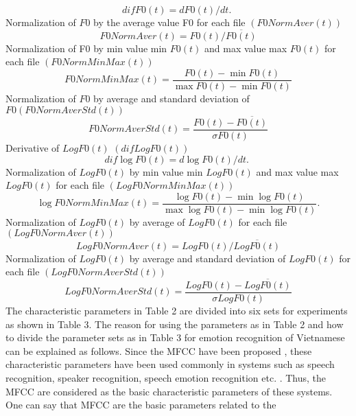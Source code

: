 \documentclass[a4paper,12pt]{article}
\begin{document}
\begin{equation}
difF0(t)=d F 0(t) / d t \text {. }
\end{equation}
Normalization of $F0$ by the average value F0 for each file $(F0NormAver(t))$
\begin{equation}
F 0  NormAver (t)=F 0(t) / \overline{F 0(t)}
\end{equation}
Normalization of F0 by min value min $F0(t)$ and max value max $F0(t)$ for each file
$(F0NormMinMax (t))$
\begin{equation}
 F0NormMinMax (t)=\frac{F 0(t)-\min F 0(t)}{\max F 0(t)-\min F 0(t)}
\end{equation}
Normalization of $F0$ by average and standard deviation of $F0 (F0NormAverStd (t))$
\begin{equation}
F 0 NormAverStd (t)=\frac{F 0(t)-\overline{F 0(t)}}{\sigma F 0(t)}
\end{equation}
Derivative of $LogF0 (t)$ $(difLogF0 (t))$
\begin{equation}
 dif  \log F 0(t)=d \log F 0(t) / d t \text {. }
\end{equation}
Normalization of $LogF0 (t)$ by min value min $LogF0 (t)$ and max value max $LogF0 (t) $
for each file $(LogF0NormM inM ax (t))$
\begin{equation}
\log F 0  NormMinMax (t)=\frac{\log F 0(t)-\min \log F 0(t)}{\max \log F 0(t)-\min \log F 0(t)} .
\end{equation}
Normalization of $LogF0 (t)$ by average of $LogF0(t)$ for each file $(LogF0NormAver (t))$
\begin{equation}
    LogF0NormAver(t) = LogF0(t)/\overline{LogF0(t)}
\end{equation}
Normalization of $LogF0 (t)$ by average and standard deviation of $LogF0 (t)$ for each file
$(LogF0NormAverStd (t))$
\begin{equation}
    LogF0NormAverStd (t) = \frac{ LogF0(t)-\overline{LogF0(t)}}{\sigma LogF0(t)}
\end{equation}
The characteristic parameters in Table 2 are divided into six sets for experiments as
shown in Table 3. The reason for using the parameters as in Table 2 and how to divide
the parameter sets as in Table 3 for emotion recognition of Vietnamese can be explained as follows. Since the MFCC have been proposed \cite{16,17}, these characteristic parameters
have been used commonly in systems such as speech recognition, speaker recognition, speech
emotion recognition etc. \cite{1}. Thus, the MFCC are considered as the basic characteristic
parameters of these systems. One can say that MFCC are the basic parameters related to the
\end{document}
